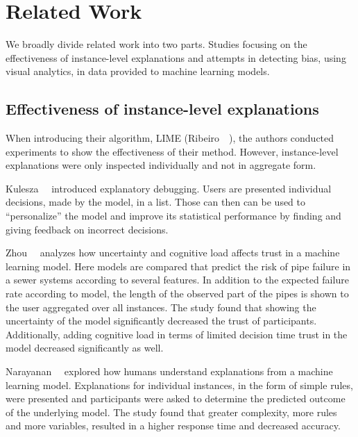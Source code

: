 \section{Related Work}
\label{sec:relatedwork}

We broadly divide related work into two parts.
Studies focusing on the effectiveness of instance-level explanations and attempts in detecting bias, using visual analytics, in data provided to machine learning models.


\subsection{Effectiveness of instance-level explanations}
When introducing their algorithm, LIME (Ribeiro~\etal~\cite{DBLP:journals/corr/RibeiroSG16, anchors:aaai18,2016arXiv161105817T}), the authors conducted experiments to show the effectiveness of their method.
However, instance-level explanations were only inspected individually and not in aggregate form.

Kulesza~\etal~\cite{Kulesza:2015:PED:2678025.2701399} introduced explanatory debugging.
Users are presented individual decisions, made by the model, in a list.
Those can then can be used to ``personalize'' the model and improve its statistical performance by finding and giving feedback on incorrect decisions.

Zhou~\etal~\cite{Zhou:2017:EUC:3176444.3176447} analyzes how uncertainty and cognitive load affects trust in a machine learning model.
Here models are compared that predict the risk of pipe failure in a sewer systems according to several features.
In addition to the expected failure rate according to model, the length of the observed part of the pipes is shown to the user aggregated over all instances.
The study found that showing the uncertainty of the model significantly decreased the trust of participants.
Additionally, adding cognitive load in terms of limited decision time trust in the model decreased significantly as well.

Narayanan~\etal~\cite{2018arXiv180200682N} explored how humans understand explanations from a machine learning model.
Explanations for individual instances, in the form of simple rules, were presented and participants were asked to determine the predicted outcome of the underlying model.
The study found that greater complexity, more rules and more variables, resulted in a higher response time and decreased accuracy.

